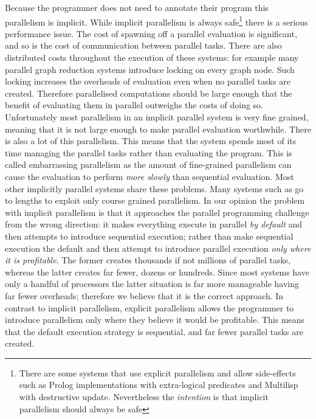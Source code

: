 Because the programmer does not need to annotate their program this
parallelism is implicit.
While implicit parallelism is always safe\footnote{
    There are some systems that use explicit parallelism and allow
    side-effects such as
    Prolog implementations with extra-logical predicates and
    Multilisp with destructive update. 
    Nevertheless the \emph{intention} is that implicit parallelism should
    always be safe}
there is a serious performance issue.
The cost of spawning off a parallel evaluation is significant,
and so is the cost of communication between parallel tasks.
There are also distributed costs throughout the execution of these systems:
for example many parallel graph reduction systems introduce locking on every
graph node.
Such locking increases the overheads of evaluation even when no parallel
tasks are created.
Therefore parallelised computations should be large enough that the benefit
of evaluating them in parallel outweighs the costs of doing so.
Unfortunately most parallelism in an implicit parallel system is very
fine grained, meaning that it is not large enough to make parallel
evaluation worthwhile.
There is also a lot of this parallelism.
This means that the system spends most of its time managing the parallel
tasks rather than evaluating the program.
This is called embarrassing parallelism as the amount of fine-grained
parallelism can cause the evaluation to perform \emph{more slowly} than
sequential evaluation.
Most other implicitly parallel systems share these problems.
Many systems such as \citet*{peyton-jones:1989:parallel-graph-reduction} go
to lengths to exploit only course grained parallelism.
In our opinion the problem with implicit parallelism is that it approaches
the parallel programming challenge from the wrong direction:
it makes everything execute in parallel \emph{by default} and then attempts
to introduce sequential execution;
rather than make sequential execution the default and then
attempt to introduce parallel execution \emph{only where it is profitable}.
The former creates thousands if not millions of parallel tasks,
whereas the latter creates far fewer, dozens or hundreds.
Since most systems have only a handful of processors the latter situation is
far more manageable having far fewer overheads;
therefore we believe that it is the correct approach.
In contrast to implicit parallelism,
explicit parallelism allows the programmer to introduce
parallelism only where they believe it would be profitable.
This means that the default execution strategy is sequential,
and far fewer parallel tasks are created.

